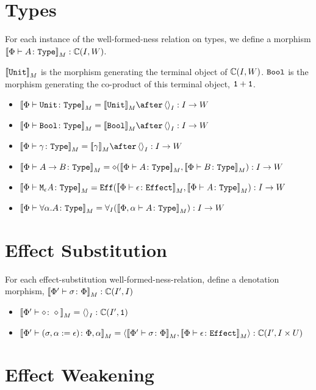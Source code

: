 \documentclass{report}
\begin{document}
\section{Types}
For each instance of the well-formed-ness relation on types, we define a morphism ${\bf [\![}\Phi \vdash A \colon \texttt{Type}{\bf ]\!]}_M: \mathbb{C}(I, W)$.

${\bf [\![}\texttt{Unit}{\bf ]\!]}_M$ is the morphism generating the terminal object of $\mathbb{C}(I, W)$. $\texttt{Bool}$ is the morphism generating the co-product of this terminal object, $\texttt{1} + \texttt{1}$.
\begin{itemize}
    \item $\deno{\typerelation{\P}{\U}{\type}} = \deno{\U}\after\term{I}: I \rightarrow W$
    
    \item $\deno{\typerelation{\P}{\B}{\type}} = \deno{\B}\after\term{I}: I \rightarrow W$
    
    \item $\deno{\typerelation{\P}{\g}{\type}} = \deno{\g}\after\term{I} : I \rightarrow W$
    
    \item ${\bf [\![}\Phi \vdash A\rightarrow B \colon \texttt{Type}{\bf ]\!]}_M = \diamond({\bf [\![}\Phi \vdash A \colon \texttt{Type}{\bf ]\!]}_M,{\bf [\![}\Phi \vdash B \colon \texttt{Type}{\bf ]\!]}_M): I \rightarrow W$
    
    \item ${\bf [\![}\Phi \vdash \texttt{M}_{\epsilon}{A} \colon \texttt{Type}{\bf ]\!]}_M =\texttt{Eff}({\bf [\![}\Phi \vdash \epsilon \colon \texttt{Effect}{\bf ]\!]}_M,{\bf [\![}\Phi \vdash A \colon \texttt{Type}{\bf ]\!]}_M): I \rightarrow W$
    \item ${\bf [\![}\Phi \vdash \forall \alpha. A \colon \texttt{Type}{\bf ]\!]}_M =\forall_I({\bf [\![}\Phi,\alpha \vdash A \colon \texttt{Type}{\bf ]\!]}_M): I \rightarrow W$
\end{itemize}

\section{Effect Substitution}

For each effect-substitution well-formed-ness-relation, define a denotation morphism, ${\bf [\![}\Phi' \vdash \sigma \colon \Phi{\bf ]\!]}_M: \mathbb{C}(I', I)$

\begin{itemize}
    \item ${\bf [\![}\Phi' \vdash \diamond \colon \diamond{\bf ]\!]}_M = \left\langle\right\rangle_{I}: \mathbb{C}(I', \texttt{1})$
    \item ${\bf [\![}\Phi' \vdash (\sigma, \alpha:=\epsilon) \colon \Phi,\alpha{\bf ]\!]}_M = \left\langle{\bf [\![}\Phi' \vdash \sigma \colon \Phi{\bf ]\!]}_M, {\bf [\![}\Phi \vdash \epsilon \colon \texttt{Effect}{\bf ]\!]}_M\right\rangle: \mathbb{C}(I', I\times U)$
\end{itemize}
\section{Effect Weakening}
\end{document}
